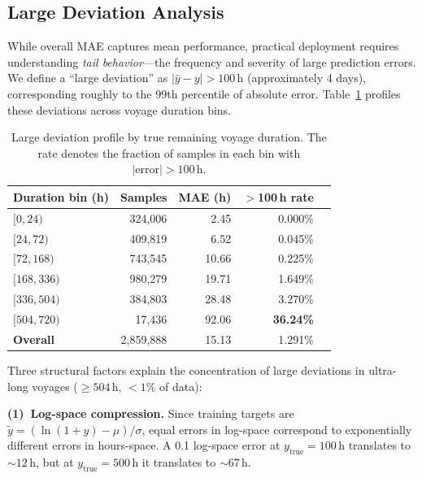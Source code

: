 \documentclass[conference]{IEEEtran}
\begin{document}
\subsection{Large Deviation Analysis}
\label{sec:large_dev}

While overall MAE captures mean performance, practical deployment requires understanding \textit{tail behavior}---the frequency and severity of large prediction errors.
We define a ``large deviation'' as $|\hat{y} - y| > 100$\,h (approximately 4 days), corresponding roughly to the 99th percentile of absolute error.
Table~\ref{tab:large_dev_profile} profiles these deviations across voyage duration bins.

\begin{table}[t]
    \centering
    \caption{Large deviation profile by true remaining voyage duration. The rate denotes the fraction of samples in each bin with $|\text{error}| > 100$\,h.}
    \label{tab:large_dev_profile}
    \begin{tabular}{lrrrr}
        \toprule
        \textbf{Duration bin (h)} & \textbf{Samples} & \textbf{MAE (h)} & \textbf{$>$100\,h rate} \\
        \midrule
        $[0, 24)$     & 324,006  & 2.45  & 0.000\% \\
        $[24, 72)$    & 409,819  & 6.52  & 0.045\% \\
        $[72, 168)$   & 743,545  & 10.66 & 0.225\% \\
        $[168, 336)$  & 980,279  & 19.71 & 1.649\% \\
        $[336, 504)$  & 384,803  & 28.48 & 3.270\% \\
        $[504, 720)$  & 17,436   & 92.06 & \textbf{36.24\%} \\
        \midrule
        \textbf{Overall}  & 2,859,888 & 15.13 & 1.291\% \\
        \bottomrule
    \end{tabular}
\end{table}

Three structural factors explain the concentration of large deviations in ultra-long voyages ($\geq 504$\,h, $< 1\%$ of data):

\textbf{(1)~Log-space compression.}
Since training targets are $\tilde{y} = (\ln(1+y) - \mu) / \sigma$, equal errors in log-space correspond to exponentially different errors in hours-space.
A 0.1 log-space error at $y_{\text{true}} = 100$\,h translates to ${\sim}12$\,h, but at $y_{\text{true}} = 500$\,h it translates to ${\sim}67$\,h.
\end{document}
